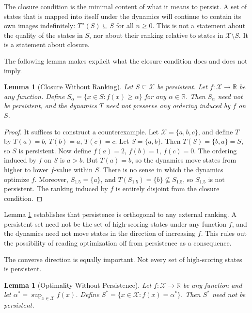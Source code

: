 \documentclass[12pt, a4paper, oneside]{article}
\theoremstyle{plain}
\newtheorem{lemma}[theorem]{Lemma}
\theoremstyle{definition}
\theoremstyle{remark}
\newcommand{\X}{\mathcal{X}}
\newcommand{\T}{T}
\begin{document}
The closure condition is the minimal content of what it means to persist. A set of states that is mapped into itself under the dynamics will continue to contain its own images indefinitely: $\T^n(S) \subseteq S$ for all $n \geq 0$. This is not a statement about the quality of the states in $S$, nor about their ranking relative to states in $\X \setminus S$. It is a statement about closure.

The following lemma makes explicit what the closure condition does and does not imply.

\begin{lemma}[Closure Without Ranking]
\label{lem:no-ranking}
Let $S \subseteq \X$ be persistent. Let $f : \X \to \mathbb{R}$ be any function. Define $S_\alpha = \{x \in S : f(x) \geq \alpha\}$ for any $\alpha \in \mathbb{R}$. Then $S_\alpha$ need not be persistent, and the dynamics $\T$ need not preserve any ordering induced by $f$ on $S$.
\end{lemma}

\begin{proof}
It suffices to construct a counterexample. Let $\X = \{a, b, c\}$, and define $\T$ by $\T(a) = b$, $\T(b) = a$, $\T(c) = c$. Let $S = \{a, b\}$. Then $\T(S) = \{b, a\} = S$, so $S$ is persistent. Now define $f(a) = 2$, $f(b) = 1$, $f(c) = 0$. The ordering induced by $f$ on $S$ is $a > b$. But $\T(a) = b$, so the dynamics move states from higher to lower $f$-value within $S$. There is no sense in which the dynamics optimize $f$. Moreover, $S_{1.5} = \{a\}$, and $\T(S_{1.5}) = \{b\} \not\subseteq S_{1.5}$, so $S_{1.5}$ is not persistent. The ranking induced by $f$ is entirely disjoint from the closure condition.
\end{proof}

Lemma \ref{lem:no-ranking} establishes that persistence is orthogonal to any external ranking. A persistent set need not be the set of high-scoring states under any function $f$, and the dynamics need not move states in the direction of increasing $f$. This rules out the possibility of reading optimization off from persistence as a consequence.

The converse direction is equally important. Not every set of high-scoring states is persistent.

\begin{lemma}[Optimality Without Persistence]
\label{lem:opt-no-persist}
Let $f : \X \to \mathbb{R}$ be any function and let $\alpha^* = \sup_{x \in \X} f(x)$. Define $S^* = \{x \in \X : f(x) = \alpha^*\}$. Then $S^*$ need not be persistent.
\end{lemma}
\end{document}
